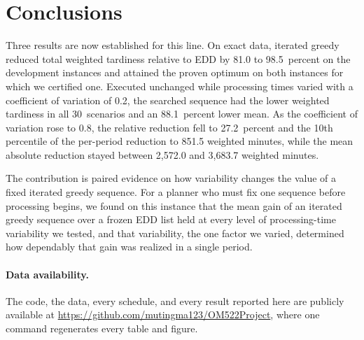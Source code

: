 \section{Conclusions}\label{sec:conclusions}

\sumpara Three results are now established for this line. \sumparaend
\fin On exact data, iterated greedy reduced total weighted tardiness relative to EDD by 81.0 to 98.5~percent on the development instances and attained the proven optimum on both instances for which we certified one. \fine
\fin Executed unchanged while processing times varied with a coefficient of variation of 0.2, the searched sequence had the lower weighted tardiness in all 30~scenarios and an 88.1~percent lower mean. \fine
\fin As the coefficient of variation rose to 0.8, the relative reduction fell to 27.2~percent and the 10th percentile of the per-period reduction to 851.5 weighted minutes, while the mean absolute reduction stayed between 2,572.0 and 3,683.7 weighted minutes. \fine

\sumpara The contribution is paired evidence on how variability changes the value of a fixed iterated greedy sequence. \sumparaend
\fin For a planner who must fix one sequence before processing begins, we found on this instance that the mean gain of an iterated greedy sequence over a frozen EDD list held at every level of processing-time variability we tested, and that variability, the one factor we varied, determined how dependably that gain was realized in a single period. \fine

\paragraph{Data availability.}
\fin The code, the data, every schedule, and every result reported here are publicly available at \url{https://github.com/mutingma123/OM522Project}, where one command regenerates every table and figure. \fine
